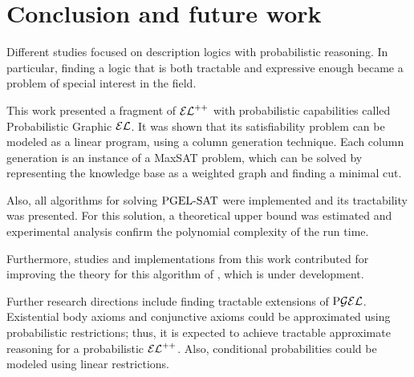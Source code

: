 
\chapter{Conclusion and future work}
\label{cap:conclusion}

Different studies focused on description logics with probabilistic reasoning. In particular, finding a logic that is both tractable and expressive enough became a problem of special interest in the field. 

This work presented a fragment of $\mathcal{EL}^{++}$ with probabilistic capabilities called Probabilistic Graphic $\mathcal{EL}$. It was shown that its satisfiability problem can be modeled as a linear program, using a column generation technique. Each column generation is an instance of a MaxSAT problem, which can be solved by representing the knowledge base as a weighted graph and finding a minimal cut. 

Also, all algorithms for solving $\text{PGEL-SAT}$ were implemented and its tractability was presented. For this solution, a theoretical upper bound was estimated and experimental analysis confirm the polynomial complexity of the run time.

Furthermore, studies and implementations from this work contributed for improving the theory for this algorithm of \citet{Fin2020}, which is under development.

Further research directions include finding tractable extensions of $\text{P}\mathcal{GEL}$. Existential body axioms and conjunctive axioms could be approximated using probabilistic restrictions; thus, it is expected to achieve tractable approximate reasoning for a probabilistic $\mathcal{EL}^{++}$. Also, conditional probabilities could be modeled using linear restrictions.